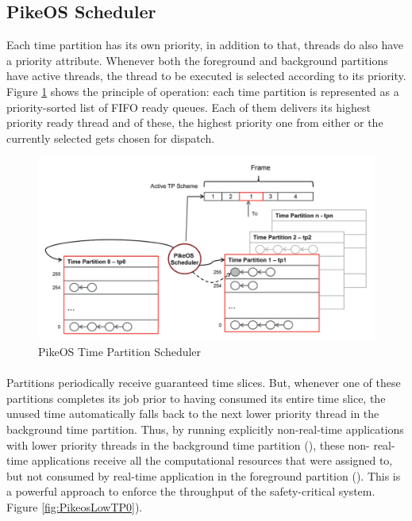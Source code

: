 \subsection{PikeOS Scheduler}\label{sec:P4Scheduler}
Each time partition has its own priority, in addition to that, threads do also have a priority attribute. Whenever both the foreground and background partitions have active threads, the thread to be executed is selected according to its priority. Figure \ref{fig:PikeosScheduler} shows the principle of operation: each time partition is represented as a priority-sorted list of FIFO ready queues. Each of them delivers its highest priority ready thread and of these, the highest priority one from either  or the currently selected  gets chosen for dispatch.

\begin{figure}[htbp] 
\centering    
\includegraphics[width=1.0\textwidth]{PikeosScheduler}
\caption{PikeOS Time Partition Scheduler}
\label{fig:PikeosScheduler}
\end{figure}

\paragraph{} Partitions periodically receive guaranteed time slices. But, whenever one of these partitions completes its job prior to having consumed its entire time slice, the unused time automatically falls back to the next lower priority thread in the background time partition. Thus, by running explicitly non-real-time applications with lower priority threads in the background time partition (), these non- real-time applications receive all the computational resources that were assigned to, but not consumed by real-time application in the foreground partition (). This is a powerful approach to enforce the throughput of the safety-critical system. Figure \ref{fig:PikeosLowTP0}).


